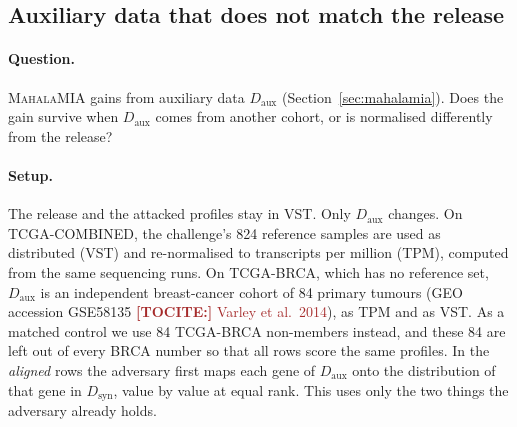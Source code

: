 \documentclass[webpdf,contemporary,large]{oup-authoring-template}
\newif\ifdraft \drafttrue
\newcommand{\annot}[3]{\ifdraft\textcolor{#1}{\textbf{[#2:]} #3}\fi}
\newcommand{\tocite}[1]{\annot{Brown}{TOCITE}{#1}}
\newcommand{\Dsyn}{D_{\mathrm{syn}}}
\newcommand{\Daux}{D_{\mathrm{aux}}}
\newcommand{\mahala}{\textsc{MahalaMIA}}
\begin{document}
\begin{appendices}
\subsection{Auxiliary data that does not match the release}
\label{app:auxmismatch}

\paragraph{Question.}
\mahala{} gains from auxiliary data $\Daux$ (Section~\ref{sec:mahalamia}). Does the gain survive when $\Daux$ comes from another cohort, or is normalised differently from the release?

\paragraph{Setup.}
The release and the attacked profiles stay in VST. Only $\Daux$ changes.
On TCGA-COMBINED, the challenge's 824 reference samples are used as distributed (VST) and re-normalised to transcripts per million (TPM), computed from the same sequencing runs.
On TCGA-BRCA, which has no reference set, $\Daux$ is an independent breast-cancer cohort of 84 primary tumours (GEO accession GSE58135 \tocite{Varley et al.\ 2014}), as TPM and as VST. As a matched control we use 84 TCGA-BRCA non-members instead, and these 84 are left out of every BRCA number so that all rows score the same profiles.
In the \emph{aligned} rows the adversary first maps each gene of $\Daux$ onto the distribution of that gene in $\Dsyn$, value by value at equal rank. This uses only the two things the adversary already holds.


\end{appendices}
\end{document}
